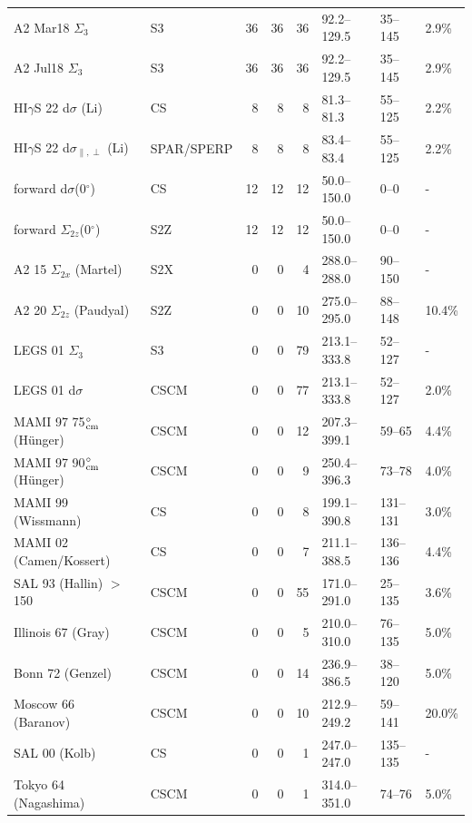 \begin{tabular}{llrrrlll}
A2 Mar18 $\Sigma_{3}$~\cite{Mornacchi thesis} & S3 & 36 & 36 & 36 & 92.2--129.5 & 35--145 & 2.9\% \\
A2 Jul18 $\Sigma_{3}$~\cite{Mornacchi thesis} & S3 & 36 & 36 & 36 & 92.2--129.5 & 35--145 & 2.9\% \\
HI$\gamma$S 22 d$\sigma$ (Li)~\cite{Li:2022vnz} & CS & 8 & 8 & 8 & 81.3--81.3 & 55--125 & 2.2\% \\
HI$\gamma$S 22 d$\sigma_{\parallel,\perp}$ (Li)~\cite{Li:2022vnz} & SPAR/SPERP & 8 & 8 & 8 & 83.4--83.4 & 55--125 & 2.2\% \\
forward d$\sigma$(0$^\circ$)~\cite{Gryniuk:2015eza,Gryniuk:2016gnm} & CS & 12 & 12 & 12 & 50.0--150.0 & 0--0 & - \\
forward $\Sigma_{2z}$(0$^\circ$)~\cite{Gryniuk:2016gnm} & S2Z & 12 & 12 & 12 & 50.0--150.0 & 0--0 & - \\
A2 15 $\Sigma_{2x}$ (Martel)~\cite{A2:2014iky} & S2X & 0 & 0 & 4 & 288.0--288.0 & 90--150 & - \\
A2 20 $\Sigma_{2z}$ (Paudyal)~\cite{A2:2019bqm} & S2Z & 0 & 0 & 10 & 275.0--295.0 & 88--148 & 10.4\% \\
LEGS 01 $\Sigma_{3}$~\cite{Blanpied:2001ae} & S3 & 0 & 0 & 79 & 213.1--333.8 & 52--127 & - \\
LEGS 01 d$\sigma$~\cite{Blanpied:2001ae} & CSCM & 0 & 0 & 77 & 213.1--333.8 & 52--127 & 2.0\% \\
MAMI 97 75$^\circ_{\rm cm}$ (H\"unger)~\cite{Hunger:1997pt} & CSCM & 0 & 0 & 12 & 207.3--399.1 & 59--65 & 4.4\% \\
MAMI 97 90$^\circ_{\rm cm}$ (H\"unger)~\cite{Hunger:1997pt} & CSCM & 0 & 0 & 9 & 250.4--396.3 & 73--78 & 4.0\% \\
MAMI 99 (Wissmann)~\cite{Wissmann:1999vi} & CS & 0 & 0 & 8 & 199.1--390.8 & 131--131 & 3.0\% \\
MAMI 02 (Camen/Kossert)~\cite{Camen:2001st,Kossert:2002ws} & CS & 0 & 0 & 7 & 211.1--388.5 & 136--136 & 4.4\% \\
SAL 93 (Hallin) $>$150~\cite{Hallin:1993ft} & CSCM & 0 & 0 & 55 & 171.0--291.0 & 25--135 & 3.6\% \\
Illinois 67 (Gray)~\cite{Gray:1967zzd} & CSCM & 0 & 0 & 5 & 210.0--310.0 & 76--135 & 5.0\% \\
Bonn 72 (Genzel)~\cite{Genzel:1972ba} & CSCM & 0 & 0 & 14 & 236.9--386.5 & 38--120 & 5.0\% \\
Moscow 66 (Baranov)~\cite{Baranov:1966aaa} & CSCM & 0 & 0 & 10 & 212.9--249.2 & 59--141 & 20.0\% \\
SAL 00 (Kolb)~\cite{Kolb:2000ix} & CS & 0 & 0 & 1 & 247.0--247.0 & 135--135 & - \\
Tokyo 64 (Nagashima)~\cite{Nagashima:1964zz} & CSCM & 0 & 0 & 1 & 314.0--351.0 & 74--76 & 5.0\% \\
\hline
\end{tabular}
